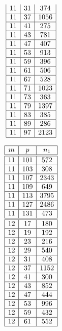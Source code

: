 \documentclass[a4paper, 10pt]{article}
\begin{document}
\begin{center}
\begin{minipage}[t]{.23\textwidth}
\begin{displaymath}
\begin{array}{|c|c|c|}
11 & 31 & 374 \\ \hline
11 & 37 & 1056 \\ \hline
11 & 41 & 275 \\ \hline
11 & 43 & 781 \\ \hline
11 & 47 & 407 \\ \hline
11 & 53 & 913 \\ \hline
11 & 59 & 396 \\ \hline
11 & 61 & 506 \\ \hline
11 & 67 & 528 \\ \hline
11 & 71 & 1023 \\ \hline
11 & 73 & 363 \\ \hline
11 & 79 & 1397 \\ \hline
11 & 83 & 385 \\ \hline
11 & 89 & 286 \\ \hline
11 & 97 & 2123 \\ \hline
\end{array}
\end{displaymath}
\end{minipage}
\begin{minipage}[t]{.23\textwidth}
\begin{displaymath}
\begin{array}{|c|c|c|}
\hline
m & p & n_{1} \\ \hline
\hline
11 & 101 & 572 \\ \hline
11 & 103 & 308 \\ \hline
11 & 107 & 2343 \\ \hline
11 & 109 & 649 \\ \hline
11 & 113 & 3795 \\ \hline
11 & 127 & 2486 \\ \hline
11 & 131 & 473 \\ \hline
\hline
12 & 17 & 180 \\ \hline
12 & 19 & 192 \\ \hline
12 & 23 & 216 \\ \hline
12 & 29 & 540 \\ \hline
12 & 31 & 408 \\ \hline
12 & 37 & 1152 \\ \hline
12 & 41 & 300 \\ \hline
12 & 43 & 852 \\ \hline
12 & 47 & 444 \\ \hline
12 & 53 & 996 \\ \hline
12 & 59 & 432 \\ \hline
12 & 61 & 552 \\ \hline

\end{array}
\end{displaymath}
\end{minipage}
\end{center}
\end{document}
